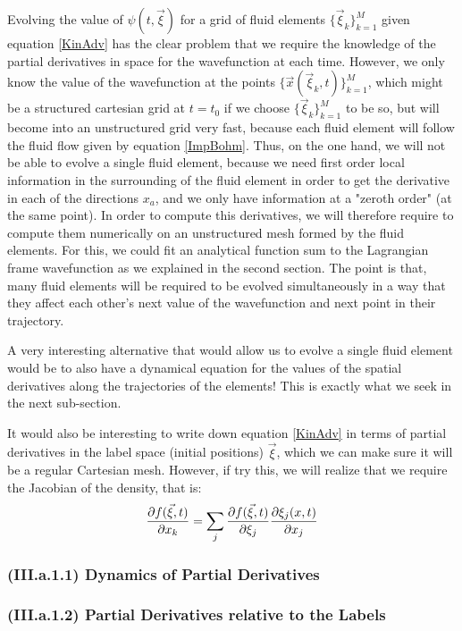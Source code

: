 \documentclass[11pt, a4paper]{article} %
\begin{document}
Evolving the value of $\psi(t,\vec{\xi})$ for a grid of fluid elements $\{\vec{\xi}_k\}_{k=1}^M$ given equation \eqref{KinAdv} has the clear problem that we require the knowledge of the partial derivatives in space for the wavefunction at each time. However, we only know the value of the wavefunction at the points $\{\vec{x}(\vec{\xi}_k,t)\}_{k=1}^M$, which might be a structured cartesian grid at $t=t_0$ if we choose $\{\vec{\xi}_k\}_{k=1}^M$ to be so, but will become into an unstructured grid very fast, because each fluid element will follow the fluid flow given by equation \eqref{ImpBohm}. Thus, on the one hand, we will not be able to evolve a single fluid element, because we need first order local information in the surrounding of the fluid element in order to get the derivative in each of the directions $x_a$, and we only have information at a "zeroth order" (at the same point). In order to compute this derivatives, we will therefore require to compute them numerically on an unstructured mesh formed by the fluid elements. For this, we could fit an analytical function sum to the Lagrangian frame wavefunction as we explained in the second section. The point is that, many fluid elements will be required to be evolved simultaneously in a way that they affect each other's next value of the wavefunction and next point in their trajectory.

A very interesting alternative that would allow us to evolve a single fluid element would be to also have a dynamical equation for the values of the spatial derivatives along the trajectories of the elements! This is exactly what we seek in the next sub-section.

It would also be interesting to write down equation \eqref{KinAdv} in terms of partial derivatives in the label space (initial positions) $\vec{\xi}$, which we can make sure it will be a regular Cartesian mesh. However, if try this, we will realize that we require the Jacobian of the density, that is:
\begin{equation}
\pdv{f(\vec{\xi},t)}{x_k}=\sum_j \pdv{f(\vec{\xi},t)}{\xi_j}\pdv{\xi_j(x,t)}{x_j}
\end{equation}
\subsubsection*{(III.a.1.1) Dynamics of Partial Derivatives}

\subsubsection*{(III.a.1.2) Partial Derivatives relative to the Labels}
\end{document}
